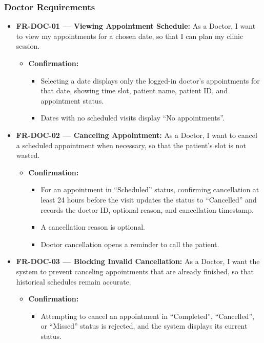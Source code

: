 \documentclass[11pt,a4paper]{article}
\begin{document}
\subsubsection{Doctor Requirements}

\begin{itemize}
    \item \textbf{FR-DOC-01 — Viewing Appointment Schedule:} As a Doctor, I want to view my appointments for a chosen date, so that I can plan my clinic session.
    \begin{itemize}
        \item \textbf{Confirmation:}
        \begin{itemize}
            \item Selecting a date displays only the logged-in doctor's appointments for that date, showing time slot, patient name, patient ID, and appointment status.
            \item Dates with no scheduled visits display ``No appointments''.
        \end{itemize}
    \end{itemize}

    \item \textbf{FR-DOC-02 — Canceling Appointment:} As a Doctor, I want to cancel a scheduled appointment when necessary, so that the patient's slot is not wasted.
    \begin{itemize}
        \item \textbf{Confirmation:}
        \begin{itemize}
            \item For an appointment in ``Scheduled'' status, confirming cancellation at least 24 hours before the visit updates the status to ``Cancelled'' and records the doctor ID, optional reason, and cancellation timestamp.
            \item A cancellation reason is optional.
            \item Doctor cancellation opens a reminder to call the patient.
        \end{itemize}
    \end{itemize}

    \item \textbf{FR-DOC-03 — Blocking Invalid Cancellation:} As a Doctor, I want the system to prevent canceling appointments that are already finished, so that historical schedules remain accurate.
    \begin{itemize}
        \item \textbf{Confirmation:}
        \begin{itemize}
            \item Attempting to cancel an appointment in ``Completed'', ``Cancelled'', or ``Missed'' status is rejected, and the system displays its current status.
        \end{itemize}
    \end{itemize}


\end{itemize}
\end{document}
